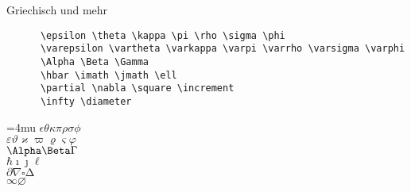 \begin{frame}[fragile]{Griechisch und mehr}
  \begin{CodeExample}{0.7}
    \begin{verbatim}
      \epsilon \theta \kappa \pi \rho \sigma \phi
      \varepsilon \vartheta \varkappa \varpi \varrho \varsigma \varphi
      \Alpha \Beta \Gamma
      \hbar \imath \jmath \ell
      \partial \nabla \square \increment
      \infty \diameter
    \end{verbatim}
  \CodeResult
    \strut
    \Umathordordspacing\textstyle=4mu
    $\epsilon \theta \kappa \pi \rho \sigma \phi$ \\
    $\varepsilon \vartheta \varkappa \varpi \varrho \varsigma \varphi$ \\[\baselineskip]
    $\Alpha \Beta \Gamma$ \\
    $\hbar \imath \jmath \ell$ \\
    $\partial \nabla \square \increment$ \\
    $\infty \diameter$
  \end{CodeExample}
\end{frame}

